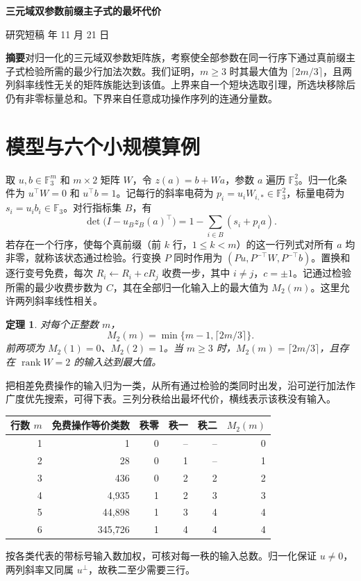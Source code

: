 \documentclass[UTF8,scheme=plain,a4paper,11pt]{ctexart}
\newcommand{\F}{\mathbb F_3}
\newtheorem{thm}{定理}
\begin{document}
\fontsize{12}{18.5}\selectfont
\begin{center}
{\LARGE\bfseries 三元域双参数前缀主子式的最坏代价\par}
\medskip 研究短稿  年 11 月 21 日
\end{center}
\noindent\textbf{摘要}\quad 对归一化的三元域双参数矩阵族，考察使全部参数在同一行序下通过真前缀主子式检验所需的最少行加法次数。我们证明，$m\ge3$ 时其最大值为 $\lceil2m/3\rceil$，且两列斜率线性无关的矩阵族能达到该值。上界来自一个短块选取引理，所选块移除后仍有非零标量总和。下界来自任意成功操作序列的连通分量数。

\section{模型与六个小规模算例}
取 $u,b\in\F^m$ 和 $m\times2$ 矩阵 $W$，令 $z(a)=b+Wa$，参数 $a$ 遍历 $\F^2$。归一化条件为 $u^\top W=0$ 和 $u^\top b=1$。记每行的斜率电荷为 $p_i=u_iW_{i,*}\in\F^2$，标量电荷为 $s_i=u_i b_i\in\F$。对行指标集 $B$，有
\[
 \det\bigl(I-u_B z_B(a)^\top\bigr)=1-\sum_{i\in B}(s_i+p_i a).
\]
若存在一个行序，使每个真前缀（前 $k$ 行，$1\le k<m$）的这一行列式对所有 $a$ 均非零，就称该状态通过检验。行变换 $P$ 同时作用为 $(Pu,P^{-\top}W,P^{-\top}b)$。置换和逐行变号免费，每次 $R_i\gets R_i+cR_j$ 收费一步，其中 $i\ne j$，$c=\pm1$。记通过检验所需的最少收费步数为 $C$，其在全部归一化输入上的最大值为 $M_2(m)$。这里允许两列斜率线性相关。
\begin{thm}\label{th}
对每个正整数 $m$，
\[
 M_2(m)=\min\{m-1,\lceil2m/3\rceil\}.
\]
前两项为 $M_2(1)=0$、$M_2(2)=1$。当 $m\ge3$ 时，$M_2(m)=\lceil2m/3\rceil$，且存在 $\operatorname{rank}W=2$ 的输入达到最大值。
\end{thm}
把相差免费操作的输入归为一类，从所有通过检验的类同时出发，沿可逆行加法作广度优先搜索，可得下表。三列分秩给出最坏代价，横线表示该秩没有输入。
\begin{center}\small
\begin{tabular}{r r r r r r}\toprule
行数 $m$ & 免费操作等价类数 & 秩零 & 秩一 & 秩二 & $M_2(m)$\\\midrule
1&1&0&--&--&0\\2&28&0&1&--&1\\3&436&0&2&2&2\\
4&4,935&1&2&3&3\\5&44,898&1&3&4&4\\6&345,726&1&4&4&4\\\bottomrule
\end{tabular}
\end{center}
按各类代表的带标号输入数加权，可核对每一秩的输入总数。归一化保证 $u\ne0$，两列斜率又同属 $u^\perp$，故秩二至少需要三行。
\end{document}
